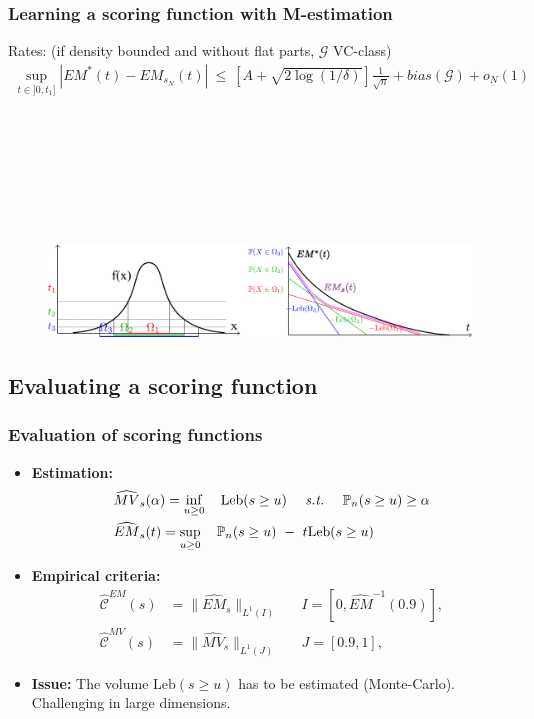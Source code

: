 \documentclass[10pt]{beamer}
\newcommand{\st}{\text{\emph{s.t.}}{}}
\newcommand\blue{\color{blue} }
\newcommand{\crit}{\mathcal{C}}
\def\leb{\text{Leb}}
\begin{document}
\begin{frame}
\frametitle{Learning a scoring function with M-estimation}

\begin{block}{}
{\blue Rates}: (if density bounded and without flat parts, $\mathcal{G}$ VC-class)
\begin{align*}
\sup_{t \in ]0,t_1]}|EM^*(t)-EM_{s_N}(t)| ~\le~ \left[A+\sqrt{2\log(1/\delta)}\right]\frac{1}{\sqrt n}+ bias(\mathcal{G}) + o_N(1)
\end{align*}
\end{block}
~\\~\\~\\~\\~\\~\\
\begin{figure}
\includegraphics[width=\linewidth]{em_optim.png}
\end{figure}

\end{frame}


\subsection{Evaluating a scoring function}


\begin{frame}
\frametitle{Evaluation of scoring functions}

\begin{itemize}
\item \textbf{Estimation:}
\small{
\begin{align*}
&\widehat{MV}_s(\alpha) = \inf_{u \ge 0} ~~~\leb(s \ge u) ~~~~\st~~~~ \mathbb{P}_n(s \ge u) \ge \alpha\\
&\widehat{EM}_s(t) = \sup_{u \ge 0} ~~~\mathbb{P}_n(s \ge u) ~-~ t \leb(s \ge u)
\end{align*}
}

\item \textbf{Empirical criteria:}
\small{
\begin{align*}
\widehat{\crit}^{EM}(s) &= \| \widehat{EM}_s \|_{L^1(I)}  &&I = [0,\widehat{EM}^{-1}(0.9)],\\
\widehat{\crit}^{MV}(s) &= \| \widehat{MV}_s \|_{L^1(J)}  &&J = [0.9, 1],
\end{align*}
}


\item \textbf{Issue:}
\small{
The volume $\leb(s \ge u)$ has to be estimated (Monte-Carlo). Challenging in large dimensions.
}

\end{itemize}
\end{frame}
\end{document}
